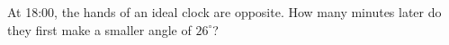 At 18:00, the hands of an ideal clock are opposite. How many minutes later do they first make a smaller angle of $26^\circ$?
